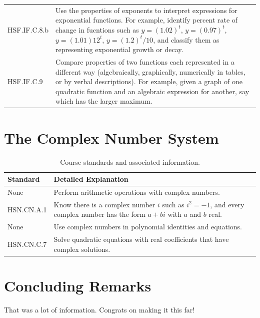 \documentclass[12pt, oneside]{book}
\begin{document}
\begin{table}[h]
\begin{tabularx}{\textwidth}{l X}
        HSF.IF.C.8.b & Use the properties of exponents to interpret expressions for exponential functions. For example, identify percent rate of change in fucntions such as $y=(1.02)^t$, $y=(0.97)^t$, $y=(1.01)12^t$, $y=(1.2)^t/10$, and classify them as representing exponential growth or decay. \\
        HSF.IF.C.9 & Compare properties of two functions each represented in a different way (algebraically, graphically, numerically in tables, or by verbal descriptions). For example, given a graph of one quadratic function and an algebraic expression for another, say which has the larger maximum. \\
        \bottomrule
    \end{tabularx}
\end{table}

\chapter{The Complex Number System}

\begin{table}[h]
    \centering
    \caption{Course standards and associated information.}
    \vspace{0.3cm} %
    \begin{tabularx}{\textwidth}{l X} %
        \toprule
        \textbf{Standard} & \textbf{Detailed Explanation} \\
        \midrule
        None & Perform arithmetic operations with complex numbers. \\
        HSN.CN.A.1 & Know there is a complex number $i$ such as $i^2=-1$, and every complex number has the form $a+bi$ with $a$ and $b$ real. \\
        None & Use complex numbers in polynomial identities and equations. \\
        HSN.CN.C.7 & Solve quadratic equations with real coefficients that have complex solutions. \\
        \bottomrule
    \end{tabularx}
\end{table}

\chapter{Concluding Remarks}

That was a lot of information. Congrats on making it this far!
\end{document}
